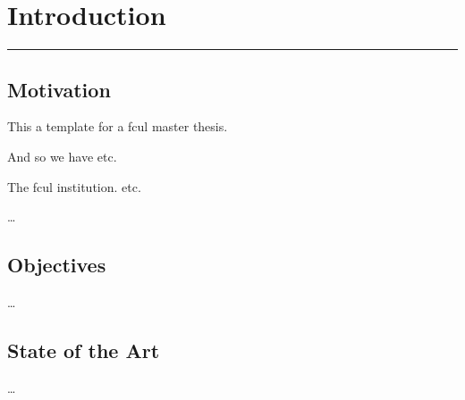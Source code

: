 \chapter{Introduction}

\lhead{}

\vspace{-1.6cm}
\begingroup
\color{gray}
\par\noindent\rule{\textwidth}{0.4pt}
\endgroup


\section{Motivation}

This a template for a \ac{fcul} master thesis.

And so we have \ac{etc}.

The \ac{fcul} institution. \Ac{etc}.

\ldots


\section{Objectives}

\ldots


\section{State of the Art}

\ldots
